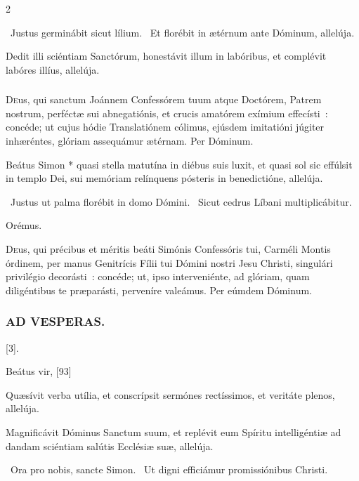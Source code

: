 \documentclass[9pt,twoside]{extarticle}
\begin{document}
\begin{multicols}{2}
\begin{tightlist}{}
\item {}~Justus germinábit sicut lílium. ~Et florébit in ætérnum ante Dóminum, allelúja.
\item {} Dedit illi sciéntiam Sanctórum, honestávit illum in labóribus, et complévit labóres illíus, allelúja.
\end{tightlist}

\subsubsection*{\center {}}
\lettrine{D}eus, qui sanctum Joánnem Confessórem tuum atque Doctórem, Patrem nostrum, perféctæ sui abnegatiónis, et crucis amatórem exímium effecísti~: concéde; ut cujus hódie Translatiónem cólimus, ejúsdem imitatióni júgiter inhæréntes, glóriam assequámur ætérnam. Per Dóminum.

\begin{tightlist}{}
\item {} Beátus Simon * quasi stella matutína in diébus suis luxit, et quasi sol sic effúlsit in templo Dei, sui memóriam relínquens pósteris in benedictióne, allelúja.
\item {}~Justus ut palma florébit in domo Dómini. ~Sicut cedrus Líbani multiplicábitur.
\item Orémus. \hfill {}
\end{tightlist}
\lettrine{D}eus, qui précibus et méritis beáti Simónis Confessóris tui, Carméli Montis órdinem, per manus Genitrícis Fílii tui Dómini nostri Jesu Christi, singulári privilégio decorásti~: concéde; ut, ipso interveniénte, ad glóriam, quam diligéntibus te præparásti, perveníre valeámus. Per eúmdem Dóminum.

\subsubsection*{\center \textsc{AD VESPERAS.}}
\begin{tightlist}{}
\item {} [3].
\item {} Beátus vir, [93]
\item {}
\item {} Quæsívit verba utília, et conscrípsit sermónes rectíssimos, et veritáte plenos, allelúja.
\item {} Magnificávit Dóminus Sanctum suum, et replévit eum Spíritu intelligéntiæ ad dandam sciéntiam salútis Ecclésiæ suæ, allelúja.
\item {}~Ora pro nobis, sancte Simon. ~Ut digni efficiámur promissiónibus Christi.
\item {}
\end{tightlist}


\end{multicols}
\end{document}

